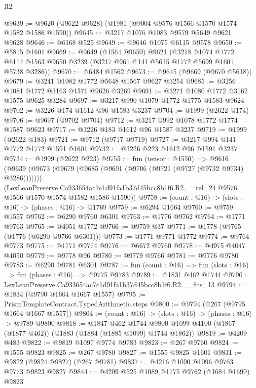 \begin{lexlean}{R2}
\begin{coremodule}
@9639 := @9620 (@9622 @9628) (@1981 (@9004 @9576 @1566 @1570 @1574 @1582 @1586 @1590))
@9645 := @3217 @1076 @1083 @9579 @5649 @9621 @9628
@9646 := @6168 @525
@9649 := @9646 @1075 @6115 @9578
@9650 := @5815 @1601
@9669 := @9649
    (@1564 @9650)
    @9621
    (@3218
      @1074
      @1772
      @6114
      @1563
      @9650
      @3239
      (@3217 @961 @141 @5615 @1772 @5699 @1601 @5738 @3286))
@9670 := @6484 @1562
@9673 := @9645 (@9669 (@9670 @5618))
@9679 := @3241 @1082 @1772 @5648 @1567 @9627 @3254
@9685 := @3256 @1081 @1772 @3163 @1571 @9626 @3269
@9691 := @3271 @1080 @1772 @3162 @1575 @9625 @3284
@9697 := @3217 @990 @1079 @1772 @1775 @1583 @9624
@9702 := @3226 @174 @1612 @96 @1583 @3237
@9704 := @1999 (@2622 @174)
@9706 := @9697 (@9702 @9704)
@9712 := @3217 @992 @1078 @1772 @1774 @1587 @9623
@9717 := @3226 @183 @1612 @96 @1587 @3237
@9719 := @1999 (@2622 @183)
@9721 := @9712 (@9717 @9719)
@9727 := @3217 @994 @141 @1772 @1772 @1591 @1601
@9732 := @3226 @223 @1612 @96 @1591 @3237
@9734 := @1999 (@2622 @223)
@9755 := fun (tensor : @1550) =>
  @9616
    (@9639
      (@9673 (@9679 (@9685 (@9691 (@9706 (@9721 (@9727 (@9732 @9734) @3286)))))))
      (LexLeanPreserve.Ca933654ac7c1d91fa1b37d45bcc8b1f6.R2.__rel_24
        @9576
        @1566
        @1570
        @1574
        @1582
        @1586
        @1590))
@9758 := (count : @16) -> (slots : @16) -> (phases : @16) -> @1769
@9759 := @6294 @1664
@9760 := @9759 @1557
@9762 := @6290 @9760 @6301
@9763 := @1776 @9762
@9764 := @1771 @9763
@9765 := @4051 @1772
@9766 := @9759 @37
@9771 := @1778 (@9765 (@1776 (@6290 @9766 @6301)))
@9773 := @1771 @9771 @1772
@9774 := @9764 @9773
@9775 := @1771 @9774
@9776 := @6672 @9760
@9778 := @4975 @4047 @4050
@9779 := @9778 @96
@9780 := @9779 @9766
@9781 := @9776 @9780
@9783 := @6290 @9781 @6301
@9787 := fun (count : @16) => fun (slots : @16) => fun (phases : @16) => @9775 @9783
@9789 := @1831 @462 @1744
@9790 := LexLeanPreserve.Ca933654ac7c1d91fa1b37d45bcc8b1f6.R2.__fits_13
@9794 := @1834 (@9790 @1664 @1667 @1557)
@9795 := PrismTemplateContract.TypedArithmetic.steps
@9800 := @9794 (@267 (@9795 @1664 @1667 @1557))
@9804 := (count : @16) -> (slots : @16) -> (phases : @16) -> @9789 @9800
@9818 := @1847
    @462
    @1744
    @9800
    @1099
    @4100
    (@1867 (@1877 @462))
    (@1883 (@1884 (@1885 @1099) @1744 @1862))
@9819 := @4209 @483
@9822 := @9819 @1097 @9774 @9783
@9823 := @267 @9760
@9824 := @1555 @9823
@9825 := @267 @9780
@9827 := @1555 @9825 @1601
@9831 := @9822 (@9824 @9827) (@267 @9781)
@9837 := @4216 @1090 @1096 @9763 @9773 @9823 @9827
@9844 := @4209 @525 @1089 @1775 @9762 (@1684 @1690) @9823

\end{coremodule}
\end{lexlean}
